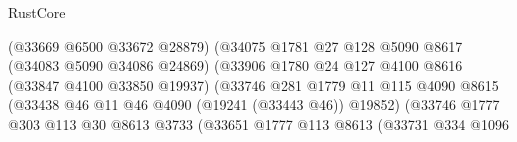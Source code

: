 \begin{lexlean}{RustCore}
\begin{coremodule}
                                                (@33669 @6500 @33672 @28879)
                                                (@34075
                                                  @1781
                                                  @27
                                                  @128
                                                  @5090
                                                  @8617
                                                  (@34083 @5090 @34086 @24869)
                                                  (@33906
                                                    @1780
                                                    @24
                                                    @127
                                                    @4100
                                                    @8616
                                                    (@33847 @4100 @33850 @19937)
                                                    (@33746
                                                      @281
                                                      @1779
                                                      @11
                                                      @115
                                                      @4090
                                                      @8615
                                                      (@33438
                                                        @46
                                                        @11
                                                        @46
                                                        @4090
                                                        (@19241 (@33443 @46))
                                                        @19852)
                                                      (@33746
                                                        @1777
                                                        @303
                                                        @113
                                                        @30
                                                        @8613
                                                        @3733
                                                        (@33651
                                                          @1777
                                                          @113
                                                          @8613
                                                          (@33731
                                                            @334
                                                            @1096

\end{coremodule}
\end{lexlean}
